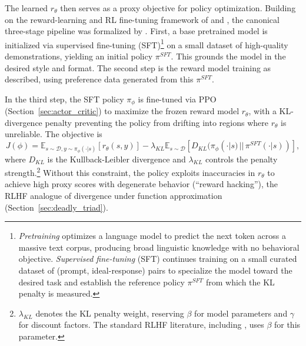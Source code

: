 The learned $r_\theta$ then serves as a proxy objective for policy optimization. Building on the reward-learning and RL fine-tuning framework of \citet{ziegler2019fine} and \citet{stiennon2020learning}, the canonical three-stage pipeline was formalized by \citet{ouyang2022training}. First, a base pretrained model is initialized via supervised fine-tuning (SFT)\footnote{\emph{Pretraining} optimizes a language model to predict the next token across a massive text corpus, producing broad linguistic knowledge with no behavioral objective. \emph{Supervised fine-tuning} (SFT) continues training on a small curated dataset of (prompt, ideal-response) pairs to specialize the model toward the desired task and establish the reference policy $\pi^{SFT}$ from which the KL penalty is measured.} on a small dataset of high-quality demonstrations, yielding an initial policy $\pi^{SFT}$. This grounds the model in the desired style and format. The second step is the reward model training as described, using preference data generated from this $\pi^{SFT}$.

In the third step, the SFT policy $\pi_\phi$ is fine-tuned via PPO (Section~\ref{sec:actor_critic}) to maximize the frozen reward model $r_\theta$, with a KL-divergence penalty preventing the policy from drifting into regions where $r_\theta$ is unreliable. The objective is
\begin{equation}
    J(\phi) = \mathbb{E}_{s \sim \mathcal{D}, y \sim \pi_\phi(\cdot|s)} [r_\theta(s, y)] - \lambda_{KL} \mathbb{E}_{s \sim \mathcal{D}} [D_{KL}(\pi_\phi(\cdot|s) \,||\, \pi^{SFT}(\cdot|s))],
\label{eq:rlhf_objective}
\end{equation}
where $D_{KL}$ is the Kullback-Leibler divergence and $\lambda_{KL}$ controls the penalty strength.\footnote{$\lambda_{KL}$ denotes the KL penalty weight, reserving $\beta$ for model parameters and $\gamma$ for discount factors. The standard RLHF literature, including \citet{rafailov2023direct}, uses $\beta$ for this parameter.} Without this constraint, the policy exploits inaccuracies in $r_\theta$ to achieve high proxy scores with degenerate behavior (``reward hacking''), the RLHF analogue of divergence under function approximation (Section~\ref{sec:deadly_triad}).

